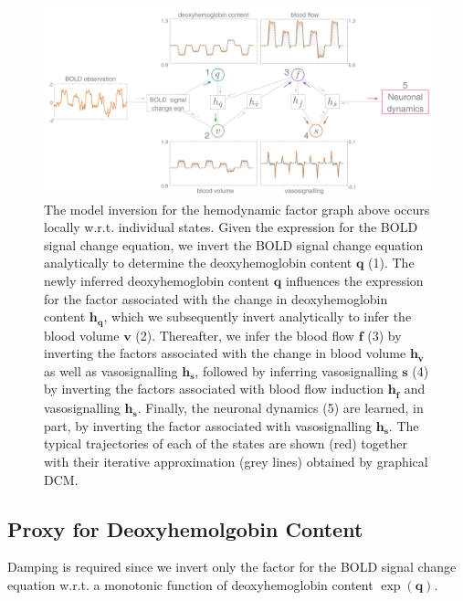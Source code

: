 \begin{figure}[H]
\centering
\includegraphics [width=6in]{hemodynamic_factor_graph.pdf}
\caption{The model inversion for the hemodynamic factor graph above occurs locally w.r.t. individual states. Given the expression for the BOLD signal change equation, we invert the BOLD signal change equation analytically to determine the deoxyhemoglobin content $\mathbf{q}$ (1). The newly inferred deoxyhemoglobin content $\mathbf{q}$ influences the expression for the factor associated with the change in deoxyhemoglobin content $\mathbf{h}_{\dot{\mathbf{q}}}$, which we subsequently invert analytically to infer the blood volume $\mathbf{v}$ (2). Thereafter, we infer the blood flow $\mathbf{f}$ (3) by inverting the factors associated with the change in blood volume $\mathbf{h}_{\dot{\mathbf{v}}}$ as well as vasosignalling $\mathbf{h}_{\dot{\mathbf{s}}}$, followed by inferring vasosignalling $\mathbf{s}$ (4) by inverting the factors associated with blood flow induction $\mathbf{h}_{\dot{\mathbf{f}}}$ and vasosignalling $\mathbf{h}_{\dot{\mathbf{s}}}$. Finally, the neuronal dynamics (5) are learned, in part, by inverting the factor associated with vasosignalling $\mathbf{h}_{\dot{\mathbf{s}}}$. The typical trajectories of each of the states are shown (red) together with their iterative approximation (grey lines) obtained by graphical DCM.}
\end{figure}
\subsection{Proxy for Deoxyhemolgobin Content}

Damping is required since we invert only the factor for the BOLD signal change equation w.r.t. a monotonic function of deoxyhemoglobin content $\exp( \mathbf{q})$.
    
